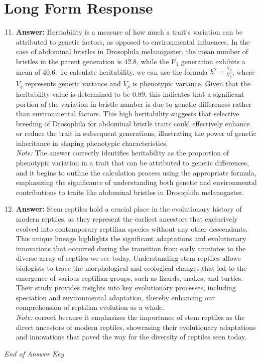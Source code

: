 \documentclass[12pt]{article}
\begin{document}
\section*{Long Form Response}
\begin{enumerate}[label=\arabic*.]
\setcounter{enumi}{10}
\item \textbf{Answer:} Heritability is a measure of how much a trait's variation can be attributed to genetic factors, as opposed to environmental influences. In the case of abdominal bristles in Drosophila melanogaster, the mean number of bristles in the parent generation is 42.8, while the F$_{1}$ generation exhibits a mean of 40.6. To calculate heritability, we can use the formula \( h^2 = \frac{V_g}{V_p} \), where \( V_g \) represents genetic variance and \( V_p \) is phenotypic variance. Given that the heritability value is determined to be 0.89, this indicates that a significant portion of the variation in bristle number is due to genetic differences rather than environmental factors. This high heritability suggests that selective breeding of Drosophila for abdominal bristle traits could effectively enhance or reduce the trait in subsequent generations, illustrating the power of genetic inheritance in shaping phenotypic characteristics.
\\ \textit{Note:} The answer correctly identifies heritability as the proportion of phenotypic variation in a trait that can be attributed to genetic differences, and it begins to outline the calculation process using the appropriate formula, emphasizing the significance of understanding both genetic and environmental contributions to traits like abdominal bristles in Drosophila melanogaster.
\item \textbf{Answer:} Stem reptiles hold a crucial place in the evolutionary history of modern reptiles, as they represent the earliest ancestors that exclusively evolved into contemporary reptilian species without any other descendants. This unique lineage highlights the significant adaptations and evolutionary innovations that occurred during the transition from early amniotes to the diverse array of reptiles we see today. Understanding stem reptiles allows biologists to trace the morphological and ecological changes that led to the emergence of various reptilian groups, such as lizards, snakes, and turtles. Their study provides insights into key evolutionary processes, including speciation and environmental adaptation, thereby enhancing our comprehension of reptilian evolution as a whole.
\\ \textit{Note:} correct because it emphasizes the importance of stem reptiles as the direct ancestors of modern reptiles, showcasing their evolutionary adaptations and innovations that paved the way for the diversity of reptiles seen today.
\end{enumerate}

\vfill
\noindent\textit{End of Answer Key}
\end{document}
